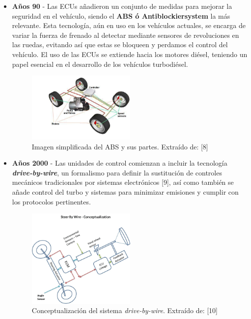 \begin{itemize}
    \item \textbf{Años 90} - Las ECUs añadieron un conjunto de medidas para mejorar la seguridad en el vehículo, siendo el \textbf{ABS ó Antiblockiersystem} la más relevante. Esta tecnología, aún en uso en los vehículos actuales, se encarga de variar la fuerza de frenado al detectar mediante sensores de revoluciones en las ruedas, evitando así que estas se bloqueen y perdamos el control del vehículo. El uso de las ECUs se extiende hacia los motores diésel, teniendo un papel esencial en el desarrollo de los vehículos turbodiésel.

    \begin{figure}[h]
        \centering
        \includegraphics[width=0.5\textwidth]{imagenes/esquema_abs.png}
        \caption{Imagen simplificada del ABS y sus partes. Extraído de: [8]}
    \end{figure}
    
 
    \item \textbf{Años 2000} - Las unidades de control comienzan a incluir la tecnología \textit{\textbf{drive-by-wire}}, un formalismo para definir la sustitución de controles mecánicos tradicionales por sistemas electrónicos [9], así como también se añade control del turbo y sistemas para minimizar emisiones y cumplir con los protocolos pertinentes.
       

    \begin{figure}[h]
        \centering
        \includegraphics[width=0.5\textwidth]{imagenes/esquema_dbw.png}
        \caption{Conceptualización del sistema \textit{drive-by-wire}. Extraído de: [10]}
    \end{figure}
          


\end{itemize}
